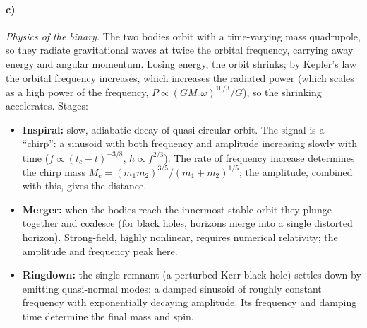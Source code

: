 \documentclass[11pt]{article}
\begin{document}
\paragraph{c)} \emph{Physics of the binary.} The two bodies orbit with a time-varying mass quadrupole, so they radiate gravitational waves at twice the orbital frequency, carrying away energy and angular momentum. Losing energy, the orbit shrinks; by Kepler's law the orbital frequency increases, which increases the radiated power (which scales as a high power of the frequency, $P\propto (GM_c\omega)^{10/3}/G$), so the shrinking accelerates. Stages:
\begin{itemize}
\item \textbf{Inspiral:} slow, adiabatic decay of quasi-circular orbit. The signal is a ``chirp'': a sinusoid with both frequency and amplitude increasing slowly with time ($f\propto(t_c-t)^{-3/8}$, $h\propto f^{2/3}$). The rate of frequency increase determines the chirp mass $M_c=(m_1m_2)^{3/5}/(m_1+m_2)^{1/5}$; the amplitude, combined with this, gives the distance.
\item \textbf{Merger:} when the bodies reach the innermost stable orbit they plunge together and coalesce (for black holes, horizons merge into a single distorted horizon). Strong-field, highly nonlinear, requires numerical relativity; the amplitude and frequency peak here.
\item \textbf{Ringdown:} the single remnant (a perturbed Kerr black hole) settles down by emitting quasi-normal modes: a damped sinusoid of roughly constant frequency with exponentially decaying amplitude. Its frequency and damping time determine the final mass and spin.
\end{itemize}

\begin{center}
\end{center}
\end{document}
